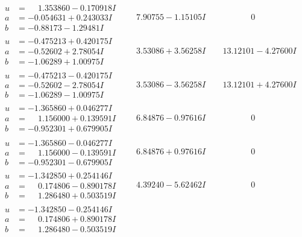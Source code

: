 \documentclass[1p]{elsarticle_modified}
\theoremstyle{definition}
\begin{document}
$$\begin{array}{c|c|c}
\begin{aligned}
u &= \phantom{-}1.353860 - 0.170918 I \\
a &= -0.054631 + 0.243033 I \\
b &= -0.88173 - 1.29481 I\end{aligned}
 & \phantom{-}7.90755 - 1.15105 I & \phantom{-0.000000 } 0 \\ \hline\begin{aligned}
u &= -0.475213 + 0.420175 I \\
a &= -0.52602 + 2.78054 I \\
b &= -1.06289 + 1.00975 I\end{aligned}
 & \phantom{-}3.53086 + 3.56258 I & \phantom{-}13.12101 - 4.27600 I \\ \hline\begin{aligned}
u &= -0.475213 - 0.420175 I \\
a &= -0.52602 - 2.78054 I \\
b &= -1.06289 - 1.00975 I\end{aligned}
 & \phantom{-}3.53086 - 3.56258 I & \phantom{-}13.12101 + 4.27600 I \\ \hline\begin{aligned}
u &= -1.365860 + 0.046277 I \\
a &= \phantom{-}1.156000 + 0.139591 I \\
b &= -0.952301 + 0.679905 I\end{aligned}
 & \phantom{-}6.84876 - 0.97616 I & \phantom{-0.000000 } 0 \\ \hline\begin{aligned}
u &= -1.365860 - 0.046277 I \\
a &= \phantom{-}1.156000 - 0.139591 I \\
b &= -0.952301 - 0.679905 I\end{aligned}
 & \phantom{-}6.84876 + 0.97616 I & \phantom{-0.000000 } 0 \\ \hline\begin{aligned}
u &= -1.342850 + 0.254146 I \\
a &= \phantom{-}0.174806 - 0.890178 I \\
b &= \phantom{-}1.286480 + 0.503519 I\end{aligned}
 & \phantom{-}4.39240 - 5.62462 I & \phantom{-0.000000 } 0 \\ \hline\begin{aligned}
u &= -1.342850 - 0.254146 I \\
a &= \phantom{-}0.174806 + 0.890178 I \\
b &= \phantom{-}1.286480 - 0.503519 I\end{aligned}

\end{array}$$
\end{document}
